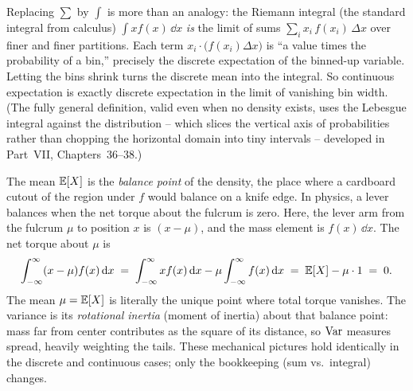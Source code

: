 \begin{connectionbox}
Replacing $\sum$ by $\int$ is more than an analogy: the Riemann integral (the standard integral from calculus) $\int x f(x)\,\dd x$ \emph{is} the
limit of sums $\sum_i x_i\, f(x_i)\,\Delta x$ over finer and finer partitions. Each
term $x_i \cdot \big(f(x_i)\Delta x\big)$ is ``a value times the probability of a
bin,'' precisely the discrete expectation of the binned-up variable. Letting the
bins shrink turns the discrete mean into the integral. So continuous expectation is
exactly discrete expectation in the limit of vanishing bin width. (The fully
general definition, valid even when no density exists, uses the Lebesgue integral
against the distribution -- which slices the vertical axis of probabilities rather
than chopping the horizontal domain into tiny intervals -- developed in Part~VII,
Chapters~36--38.)
\end{connectionbox}

\begin{intuitionbox}
The mean $\operatorname{\mathbb{E}}[X]$ is the \emph{balance point} of the density, the place where a
cardboard cutout of the region under $f$ would balance on a knife edge. In physics,
a lever balances when the net torque about the fulcrum is zero. Here, the lever arm
from the fulcrum $\mu$ to position $x$ is $(x - \mu)$, and the mass element is
$f(x)\,\dd x$. The net torque about $\mu$ is
\[
  \int_{-\infty}^{\infty} (x - \mu) f(x)\,\mathrm{d} x
  \;=\; \int_{-\infty}^{\infty} x f(x)\,\mathrm{d} x - \mu \int_{-\infty}^{\infty} f(x)\,\mathrm{d} x
  \;=\; \operatorname{\mathbb{E}}[X] - \mu \cdot 1 \;=\; 0 .
\]
The mean $\mu = \operatorname{\mathbb{E}}[X]$ is literally the unique point where total torque vanishes.
The variance is its \emph{rotational inertia} (moment of inertia) about that balance
point: mass far from center contributes as the square of its distance, so $\operatorname{Var}$
measures spread, heavily weighting the tails. These mechanical pictures hold
identically in the discrete and continuous cases; only the bookkeeping (sum vs.\
integral) changes.
\end{intuitionbox}

